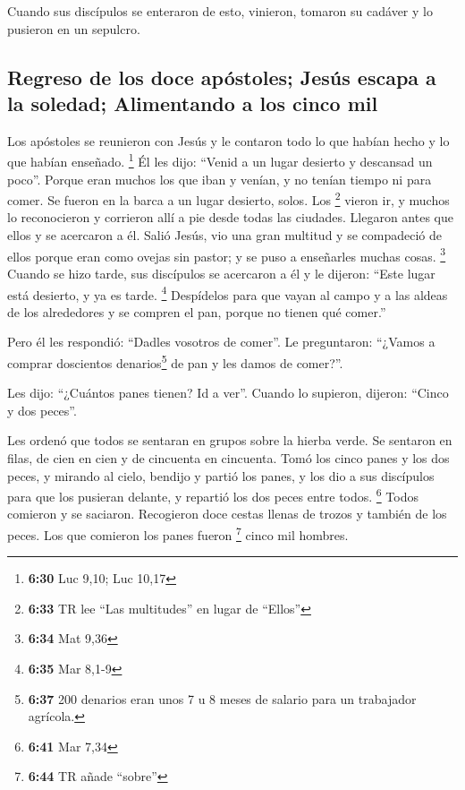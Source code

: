 \begin{paracol}{2}
 Cuando sus discípulos se enteraron de esto, vinieron,
tomaron su cadáver y lo pusieron en un sepulcro.

\hypertarget{regreso-de-los-doce-apuxf3stoles-jesuxfas-escapa-a-la-soledad-alimentando-a-los-cinco-mil}{%
\subsection{Regreso de los doce apóstoles; Jesús escapa a la soledad;
Alimentando a los cinco
mil}\label{regreso-de-los-doce-apuxf3stoles-jesuxfas-escapa-a-la-soledad-alimentando-a-los-cinco-mil}}

 Los apóstoles se reunieron con Jesús y le contaron todo
lo que habían hecho y lo que habían enseñado. \footnote{\textbf{6:30}
  Luc 9,10; Luc 10,17}  Él les dijo: ``Venid a un lugar
desierto y descansad un poco''. Porque eran muchos los que iban y
venían, y no tenían tiempo ni para comer.  Se fueron en
la barca a un lugar desierto, solos.  Los \footnote{\textbf{6:33}
  TR lee ``Las multitudes'' en lugar de ``Ellos''} vieron ir, y muchos
lo reconocieron y corrieron allí a pie desde todas las ciudades.
Llegaron antes que ellos y se acercaron a él.  Salió
Jesús, vio una gran multitud y se compadeció de ellos porque eran como
ovejas sin pastor; y se puso a enseñarles muchas cosas. \footnote{\textbf{6:34}
  Mat 9,36}  Cuando se hizo tarde, sus discípulos se
acercaron a él y le dijeron: ``Este lugar está desierto, y ya es tarde.
\footnote{\textbf{6:35} Mar 8,1-9}  Despídelos para que
vayan al campo y a las aldeas de los alrededores y se compren el pan,
porque no tienen qué comer.''

 Pero él les respondió: ``Dadles vosotros de comer''. Le
preguntaron: ``¿Vamos a comprar doscientos denarios\footnote{\textbf{6:37}
  200 denarios eran unos 7 u 8 meses de salario para un trabajador
  agrícola.} de pan y les damos de comer?''.

 Les dijo: ``¿Cuántos panes tienen? Id a ver''. Cuando lo
supieron, dijeron: ``Cinco y dos peces''.

 Les ordenó que todos se sentaran en grupos sobre la
hierba verde.  Se sentaron en filas, de cien en cien y de
cincuenta en cincuenta.  Tomó los cinco panes y los dos
peces, y mirando al cielo, bendijo y partió los panes, y los dio a sus
discípulos para que los pusieran delante, y repartió los dos peces entre
todos. \footnote{\textbf{6:41} Mar 7,34}  Todos comieron
y se saciaron.  Recogieron doce cestas llenas de trozos y
también de los peces.  Los que comieron los panes fueron
\footnote{\textbf{6:44} TR añade ``sobre''} cinco mil hombres.


\end{paracol}
